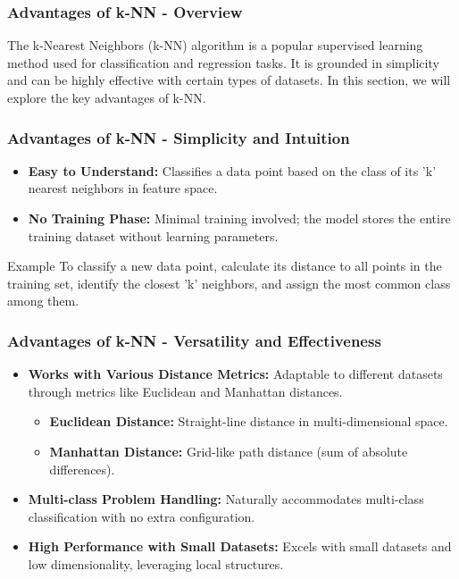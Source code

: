 \documentclass[aspectratio=169]{beamer}
\begin{document}
\begin{frame}[fragile]
    \frametitle{Advantages of k-NN - Overview}
    The k-Nearest Neighbors (k-NN) algorithm is a popular supervised learning method used for classification and regression tasks. It is grounded in simplicity and can be highly effective with certain types of datasets. In this section, we will explore the key advantages of k-NN.
\end{frame}

\begin{frame}[fragile]
    \frametitle{Advantages of k-NN - Simplicity and Intuition}
    \begin{itemize}
        \item \textbf{Easy to Understand:} Classifies a data point based on the class of its 'k' nearest neighbors in feature space.
        \item \textbf{No Training Phase:} Minimal training involved; the model stores the entire training dataset without learning parameters.
    \end{itemize}
    \begin{block}{Example}
        To classify a new data point, calculate its distance to all points in the training set, identify the closest 'k' neighbors, and assign the most common class among them.
    \end{block}
\end{frame}

\begin{frame}[fragile]
    \frametitle{Advantages of k-NN - Versatility and Effectiveness}
    \begin{itemize}
        \item \textbf{Works with Various Distance Metrics:} Adaptable to different datasets through metrics like Euclidean and Manhattan distances.
        
        \begin{itemize}
            \item \textbf{Euclidean Distance:} Straight-line distance in multi-dimensional space.
            \item \textbf{Manhattan Distance:} Grid-like path distance (sum of absolute differences).
        \end{itemize}
        
        \item \textbf{Multi-class Problem Handling:} Naturally accommodates multi-class classification with no extra configuration.

        \item \textbf{High Performance with Small Datasets:} Excels with small datasets and low dimensionality, leveraging local structures.
    \end{itemize}
\end{frame}
\end{document}
